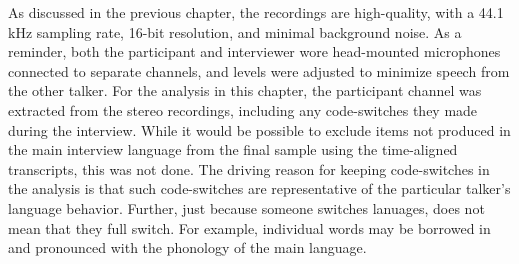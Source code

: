 

As discussed in the previous chapter, the recordings are high-quality, with a 44.1 kHz sampling rate, 16-bit resolution, and minimal background noise. As a reminder, both the participant and interviewer wore head-mounted microphones connected to separate channels, and levels were adjusted to minimize speech from the other talker. For the analysis in this chapter, the participant channel was extracted from the stereo recordings, including any code-switches they made during the interview. While it would be possible to exclude items not produced in the main interview language from the final sample using the time-aligned transcripts, this was not done. The driving reason for keeping code-switches in the analysis is that such code-switches are representative of the particular talker's language behavior. Further, just because someone switches lanuages, does not mean that they full switch. For example, individual words may be borrowed in and pronounced with the phonology of the main language. 

